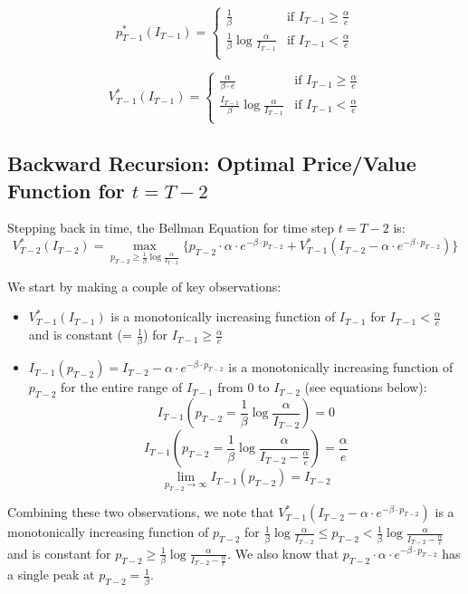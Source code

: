 \documentclass[12pt]{amsart}
\begin{document}
$$
p_{T-1}^*(I_{T-1}) = 
\begin{cases}
\frac 1 \beta & \text{if } I_{T-1} \geq \frac \alpha e \\
\frac 1 \beta \log{ \frac \alpha {I_{T-1}}} & \text{if } I_{T-1} < \frac \alpha e\\
\end{cases}
$$

$$
V_{T-1}^*(I_{T-1}) = 
\begin{cases}
\frac {\alpha} {\beta \cdot e} & \text{if } I_{T-1} \geq \frac \alpha e \\
\frac {I_{T-1}} {\beta} \log{ \frac {\alpha} {I_{T-1}}} & \text{if } I_{T-1} < \frac \alpha e\\
\end{cases}
$$

\subsection{Backward Recursion: Optimal Price/Value Function for $t = T-2$} 
   
Stepping back in time, the Bellman Equation for time step $t=T-2$ is:
$$V_{T-2}^*(I_{T-2}) = \max_{p_{T-2} \geq \frac 1 \beta \log \frac \alpha {I_{T-2}}} \{ p_{T-2} \cdot \alpha \cdot e^{-\beta \cdot p_{T-2}}  + V_{T-1}^*(I_{T-2} - \alpha \cdot e^{-\beta \cdot p_{T-2}}) \}$$
 
We start by making a couple of key observations:
\begin{itemize}
\item $V_{T-1}^*(I_{T-1})$ is a monotonically increasing function of $I_{T-1}$ for $I_{T-1} < \frac \alpha e$ and is constant (= $\frac 1 \beta$) for $I_{T-1} \geq \frac \alpha e$
\item $I_{T-1}(p_{T-2}) = I_{T-2} - \alpha \cdot e^{-\beta \cdot p_{T-2}}$ is a monotonically increasing function of $p_{T-2}$ for the entire range of $I_{T-1}$ from $0$ to $I_{T-2}$ (see equations below):
$$I_{T-1}(p_{T-2} = \frac 1 \beta \log \frac \alpha {I_{T-2}}) = 0$$
$$I_{T-1}(p_{T-2} = \frac 1 \beta \log \frac \alpha {I_{T-2} - \frac \alpha e}) = \frac \alpha e$$
$$\lim_{p_{T-2} \to \infty} I_{T-1}(p_{T-2}) = I_{T-2}$$
\end{itemize}

Combining these two observations, we note that $V_{T-1}^*(I_{T-2} - \alpha \cdot e^{-\beta \cdot p_{T-2}})$ is a monotonically increasing function of $p_{T-2}$ for $\frac 1 \beta \log \frac \alpha {I_{T-2}} \leq  p_{T-2} < \frac 1 \beta \log \frac \alpha {I_{T-2} - \frac \alpha e}$ and is constant for $p_{T-2} \geq \frac 1 \beta \log \frac \alpha {I_{T-2} - \frac \alpha e}$. We also know that $p_{T-2} \cdot \alpha \cdot e^{-\beta \cdot p_{T-2}}$ has a single peak at $p_{T-2} = \frac 1 \beta$. 
\end{document}
